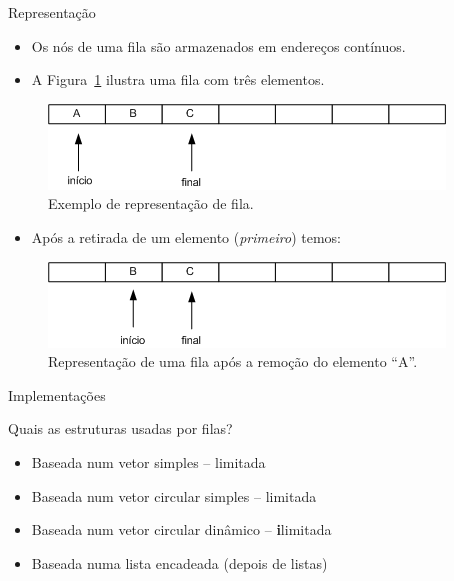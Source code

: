 
\begin{frame}{Representação}

\begin{itemize}
	\item Os nós de uma fila são armazenados em endereços contínuos.	
	\item A Figura~\ref{fig:fila-representacao} ilustra uma fila com três elementos.
\end{itemize}

\begin{figure}[ht!]
				\centering
				\includegraphics[width=.6\textwidth]{figs/fig_filas/exemplo_fila_tres_elementos.png}
				\caption{Exemplo de representação de fila.}
				\label{fig:fila-representacao}
			\end{figure} 

\begin{itemize}
	\item Após a retirada de um elemento (\textit{primeiro}) temos:

\end{itemize}

	\begin{figure}[hb!]
					\centering
				\includegraphics[width=.6\textwidth]{figs/fig_filas/exemplo_fila_tres_retirada.png}
				\caption{Representação de uma fila após a remoção do elemento ``A''.}	
	\end{figure} 

 \end{frame}

\begin{frame}{Implementações}

\begin{block}{Quais as estruturas usadas por filas?}
  \begin{itemize}
    \item Baseada num vetor simples -- limitada
    \item Baseada num vetor circular simples -- limitada
    \item Baseada num vetor circular dinâmico -- \textbf{i}limitada
    \item Baseada numa lista encadeada (depois de listas)
    
  \end{itemize}
\end{block}

\end{frame}


